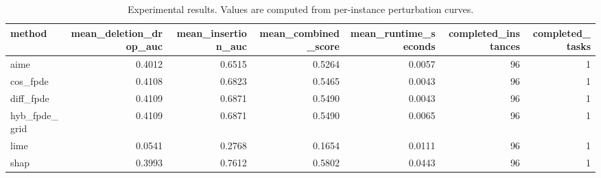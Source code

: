 \begin{table}[t]
\caption{Experimental results. Values are computed from per-instance perturbation curves.}
\label{tab:main_results_computed}
\centering
\begin{tabular}{lrrrrrr}
\toprule
method & mean\_deletion\_drop\_auc & mean\_insertion\_auc & mean\_combined\_score & mean\_runtime\_seconds & completed\_instances & completed\_tasks \\
\midrule
aime & 0.4012 & 0.6515 & 0.5264 & 0.0057 & 96 & 1 \\
cos\_fpde & 0.4108 & 0.6823 & 0.5465 & 0.0043 & 96 & 1 \\
diff\_fpde & 0.4109 & 0.6871 & 0.5490 & 0.0043 & 96 & 1 \\
hyb\_fpde\_grid & 0.4109 & 0.6871 & 0.5490 & 0.0065 & 96 & 1 \\
lime & 0.0541 & 0.2768 & 0.1654 & 0.0111 & 96 & 1 \\
shap & 0.3993 & 0.7612 & 0.5802 & 0.0443 & 96 & 1 \\
\bottomrule
\end{tabular}

\end{table}
